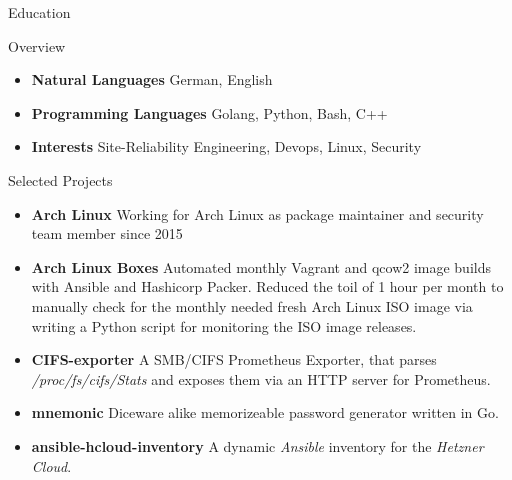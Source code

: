 \documentclass[]{mcdowellcv}
\begin{document}
\begin{cvsection}{Education}
\begin{cvsection}{Overview}
\begin{cvsubsection}{}{}{}
\begin{itemize}
\item \textbf{Natural Languages} German, English
\item \textbf{Programming Languages} Golang, Python, Bash, C++
\item \textbf{Interests} Site-Reliability Engineering, Devops, Linux, Security
\end{itemize}
\end{cvsubsection}
\end{cvsection}

\end{cvsection}
\begin{cvsection}{Selected Projects}
\begin{cvsubsection}{}{}{}
\begin{itemize}
\item \textbf{Arch Linux} Working for Arch Linux as package maintainer and security team member since 2015
\item \textbf{Arch Linux Boxes} Automated monthly Vagrant and qcow2 image builds with Ansible and Hashicorp Packer. Reduced the toil of 1 hour per month to manually check for the monthly needed fresh Arch Linux ISO image via writing a Python script for monitoring the ISO image releases.
\item \textbf{CIFS-exporter} A SMB/CIFS Prometheus Exporter, that parses \textit{/proc/fs/cifs/Stats} and exposes them via an HTTP server for Prometheus.
\item \textbf{mnemonic} Diceware alike memorizeable password generator written in Go.
\item \textbf{ansible-hcloud-inventory} A dynamic \textit{Ansible} inventory for the \textit{Hetzner Cloud}.
\end{itemize}
\end{cvsubsection}
\end{cvsection}
\end{document}
